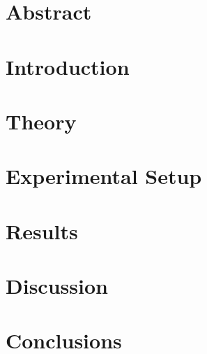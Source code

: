 \documentclass[11pt]{article}
\title{}
\author{Michael Larson, Elisabeth Unger, Samuel Flis, Christian Bourjau}
\begin{document}
\maketitle


\section{Abstract}
\section{Introduction}
\section{Theory}
\section{Experimental Setup}
\section{Results}
\section{Discussion}
\section{Conclusions}


\printbibliography
\end{document}
